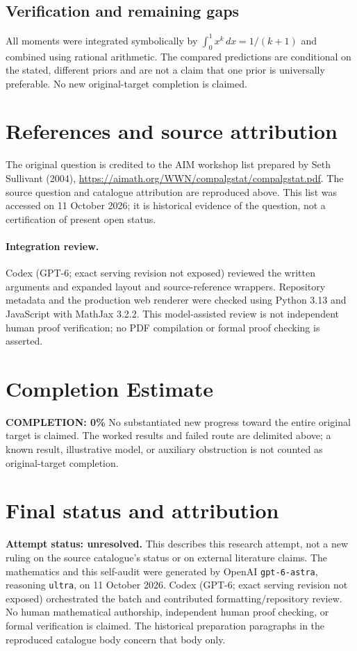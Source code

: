 \documentclass[11pt]{article}
\begin{document}
\subsection{Verification and remaining gaps}
All moments were integrated symbolically by $\int_0^1x^k\,dx=1/(k+1)$ and combined using rational arithmetic. The compared predictions are conditional on the stated, different priors and are not a claim that one prior is universally preferable. No new original-target completion is claimed.

\section{References and source attribution}
The original question is credited to the AIM workshop list prepared by Seth Sullivant (2004), \url{https://aimath.org/WWN/compalgstat/compalgstat.pdf}. The source question and catalogue attribution are reproduced above. This list was accessed on 11 October 2026; it is historical evidence of the question, not a certification of present open status.


\paragraph{Integration review.} Codex (GPT-6; exact serving revision not exposed) reviewed the written arguments and expanded layout and source-reference wrappers. Repository metadata and the production web renderer were checked using Python 3.13 and JavaScript with MathJax 3.2.2. This model-assisted review is not independent human proof verification; no PDF compilation or formal proof checking is asserted.

\section{Completion Estimate}
\noindent\textbf{COMPLETION: 0\%}
No substantiated new progress toward the entire original target is claimed. The worked results and failed route are delimited above; a known result, illustrative model, or auxiliary obstruction is not counted as original-target completion.

\section{Final status and attribution}
\textbf{Attempt status: unresolved.} This describes this research attempt, not a new ruling on the source catalogue's status or on external literature claims.
The mathematics and this self-audit were generated by OpenAI \texttt{gpt-6-astra}, reasoning \texttt{ultra}, on 11 October 2026. Codex (GPT-6; exact serving revision not exposed) orchestrated the batch and contributed formatting/repository review. No human mathematical authorship, independent human proof checking, or formal verification is claimed. The historical preparation paragraphs in the reproduced catalogue body concern that body only.
\end{document}
